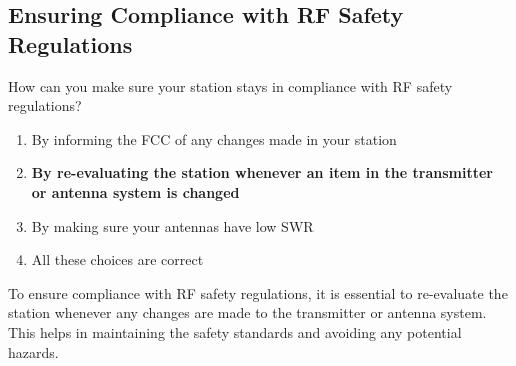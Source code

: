 \subsection{Ensuring Compliance with RF Safety Regulations}
\label{T0C09}

\begin{tcolorbox}[colback=gray!10!white,colframe=black!75!black,title=T0C09]
How can you make sure your station stays in compliance with RF safety regulations?
\begin{enumerate}[noitemsep]
    \item By informing the FCC of any changes made in your station
    \item \textbf{By re-evaluating the station whenever an item in the transmitter or antenna system is changed}
    \item By making sure your antennas have low SWR
    \item All these choices are correct
\end{enumerate}
\end{tcolorbox}

To ensure compliance with RF safety regulations, it is essential to re-evaluate the station whenever any changes are made to the transmitter or antenna system. This helps in maintaining the safety standards and avoiding any potential hazards.